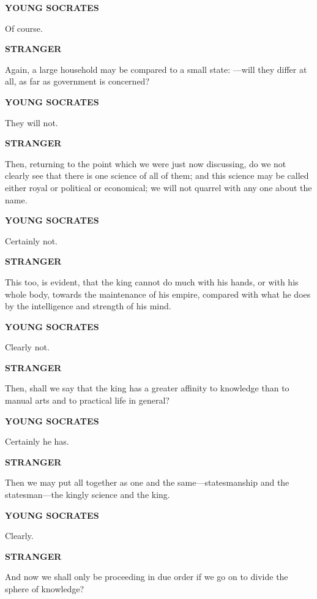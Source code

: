 \documentclass[11pt,letter]{article}
\begin{document}
\par \textbf{YOUNG SOCRATES}
\par   Of course.

\par \textbf{STRANGER}
\par   Again, a large household may be compared to a small state: —will they differ at all, as far as government is concerned?

\par \textbf{YOUNG SOCRATES}
\par   They will not.

\par \textbf{STRANGER}
\par   Then, returning to the point which we were just now discussing, do we not clearly see that there is one science of all of them; and this science may be called either royal or political or economical; we will not quarrel with any one about the name.

\par \textbf{YOUNG SOCRATES}
\par   Certainly not.

\par \textbf{STRANGER}
\par   This too, is evident, that the king cannot do much with his hands, or with his whole body, towards the maintenance of his empire, compared with what he does by the intelligence and strength of his mind.

\par \textbf{YOUNG SOCRATES}
\par   Clearly not.

\par \textbf{STRANGER}
\par   Then, shall we say that the king has a greater affinity to knowledge than to manual arts and to practical life in general?

\par \textbf{YOUNG SOCRATES}
\par   Certainly he has.

\par \textbf{STRANGER}
\par   Then we may put all together as one and the same—statesmanship and the statesman—the kingly science and the king.

\par \textbf{YOUNG SOCRATES}
\par   Clearly.

\par \textbf{STRANGER}
\par   And now we shall only be proceeding in due order if we go on to divide the sphere of knowledge?
\end{document}
